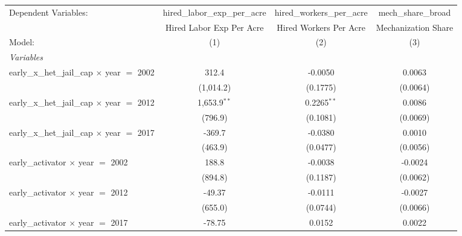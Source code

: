 
\begingroup
\centering
\begin{tabular}{lccc}
   \tabularnewline \midrule \midrule
   Dependent Variables:                                 & hired\_labor\_exp\_per\_acre     & hired\_workers\_per\_acre    & mech\_share\_broad\\    
                                                        & Hired Labor Exp Per Acre         & Hired Workers Per Acre       & Mechanization Share \\   
   Model:                                               & (1)                              & (2)                          & (3)\\  
   \midrule
   \emph{Variables}\\
   early\_x\_het\_jail\_cap $\times$ year $=$ 2002      & 312.4                            & -0.0050                      & 0.0063\\   
                                                        & (1,014.2)                        & (0.1775)                     & (0.0064)\\   
   early\_x\_het\_jail\_cap $\times$ year $=$ 2012      & 1,653.9$^{**}$                   & 0.2265$^{**}$                & 0.0086\\   
                                                        & (796.9)                          & (0.1081)                     & (0.0069)\\   
   early\_x\_het\_jail\_cap $\times$ year $=$ 2017      & -369.7                           & -0.0380                      & 0.0010\\   
                                                        & (463.9)                          & (0.0477)                     & (0.0056)\\   
   early\_activator $\times$ year $=$ 2002              & 188.8                            & -0.0038                      & -0.0024\\   
                                                        & (894.8)                          & (0.1187)                     & (0.0062)\\   
   early\_activator $\times$ year $=$ 2012              & -49.37                           & -0.0111                      & -0.0027\\   
                                                        & (655.0)                          & (0.0744)                     & (0.0066)\\   
   early\_activator $\times$ year $=$ 2017              & -78.75                           & 0.0152                       & 0.0022\\   

\end{tabular}
